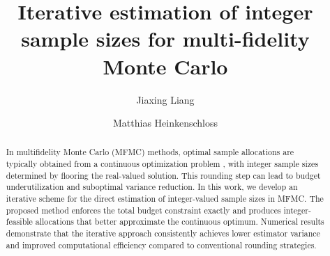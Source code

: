 \documentclass[final,3p,times,11pt]{elsarticle}
\begin{document}
\begin{frontmatter}
\title{Iterative estimation of integer sample sizes for multi-fidelity Monte Carlo}


\author[RiceCMOR]{Jiaxing Liang}
\address[RiceCMOR]{Department of Computational Applied Mathematics \& Operations Research, Rice University.}
\author[RiceCMOR]{Matthias Heinkenschloss}
\address[RiceCMOR]{Department of Computational Applied Mathematics \& Operations Research and The Ken Kennedy Institute, Rice  University.}
\begin{abstract}
In multifidelity Monte Carlo (MFMC) methods, optimal sample allocations are typically obtained from a continuous optimization problem \cite{PeGuWi:2018}, with integer sample sizes determined by flooring the real-valued solution. This rounding step can lead to budget underutilization and suboptimal variance reduction. In this work, we develop an iterative scheme for the direct estimation of integer-valued sample sizes in MFMC. The proposed method enforces the total budget constraint exactly and produces integer-feasible allocations that better approximate the continuous optimum. Numerical results demonstrate that the iterative approach consistently achieves lower estimator variance and improved computational efficiency compared to conventional rounding strategies.
\end{abstract}





%
\end{frontmatter}

 
 


 
 
 



% 

% 
\end{document}
